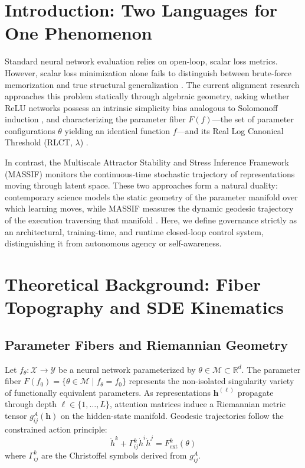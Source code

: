 \documentclass[11pt]{article}
\begin{document}
\section{Introduction: Two Languages for One Phenomenon}
Standard neural network evaluation relies on open-loop, scalar loss metrics. However, scalar loss minimization alone fails to distinguish between brute-force memorization and true structural generalization \cite{slt, massif}. The current alignment research approaches this problem statically through algebraic geometry, asking whether ReLU networks possess an intrinsic simplicity bias analogous to Solomonoff induction \cite{sterkenburg2026, valle2018deep, mingard2021neural}, and characterizing the parameter fiber $F(f)$---the set of parameter configurations $\theta$ yielding an identical function $f$---and its Real Log Canonical Threshold (RLCT, $\lambda$) \cite{smdl, grillo2026}.

In contrast, the Multiscale Attractor Stability and Stress Inference Framework (MASSIF) \cite{massif} monitors the continuous-time stochastic trajectory of representations moving through latent space. These two approaches form a natural duality: contemporary science models the static geometry of the parameter manifold over which learning moves, while MASSIF measures the dynamic geodesic trajectory of the execution traversing that manifold \cite{nielsen2020riemannian, gao2019}. Here, we define governance strictly as an architectural, training-time, and runtime closed-loop control system, distinguishing it from autonomous agency or self-awareness.

\section{Theoretical Background: Fiber Topography and SDE Kinematics}

\subsection{Parameter Fibers and Riemannian Geometry}
Let $f_\theta: \mathcal{X} \to \mathcal{Y}$ be a neural network parameterized by $\theta \in \mathcal{M} \subset \mathbb{R}^d$. The parameter fiber $F(f_0) = \{ \theta \in \mathcal{M} \mid f_\theta = f_0 \}$ represents the non-isolated singularity variety of functionally equivalent parameters. As representations $\mathbf{h}^{(\ell)}$ propagate through depth $\ell \in \{1, \dots, L\}$, attention matrices induce a Riemannian metric tensor $g_{ij}^A(\mathbf{h})$ on the hidden-state manifold. Geodesic trajectories follow the constrained action principle:
\begin{equation}
\ddot{h}^k + \Gamma_{ij}^k \dot{h}^i \dot{h}^j = F_{\text{ext}}^k(\theta)
\end{equation}
where $\Gamma_{ij}^k$ are the Christoffel symbols derived from $g_{ij}^A$.
\end{document}
